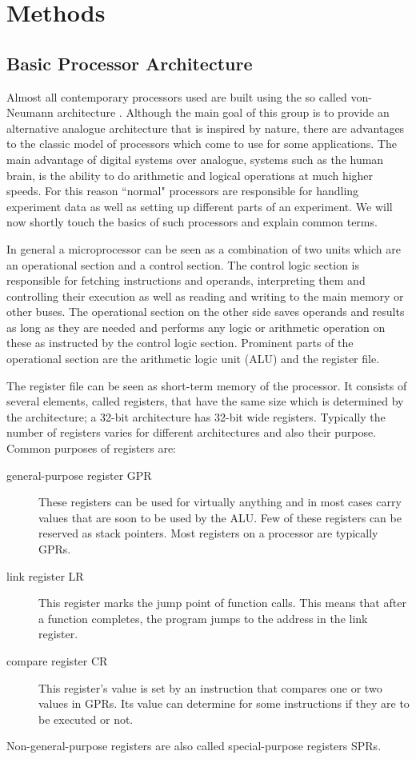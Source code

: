 \chapter{Methods}
\label{chapter:methods}

\section{Basic Processor Architecture}
\label{section:processor}

Almost all contemporary processors used are built using the so called von-Neumann architecture .
Although the main goal of this group is to provide an alternative analogue architecture that is inspired by nature, there are advantages to the classic model of processors which come to use for some applications.
The main advantage of digital systems over analogue, systems such as the human brain, is the ability to do arithmetic and logical operations at much higher speeds.
For this reason ``normal" processors are responsible for handling experiment data as well as setting up different parts of an experiment.
We will now shortly touch the basics of such processors and explain common terms.

In general a microprocessor can be seen as a combination of two units which are an operational section and a control section.
The control logic section is responsible for fetching instructions and operands, interpreting them and controlling their execution as well as reading and writing to the main memory or other buses.
The operational section on the other side saves operands and results as long as they are needed and performs any logic or arithmetic operation on these as instructed by the control logic section.
Prominent parts of the operational section are the arithmetic logic unit (ALU) and the register file.

The register file can be seen as short-term memory of the processor.
It consists of several elements, called registers, that have the same size which is determined by the architecture; a 32-bit architecture has 32-bit wide registers.
Typically the number of registers varies for different architectures and also their purpose.
Common purposes of registers are:
\begin{description}
    \item[general-purpose register GPR] These registers can be used for virtually anything and in most cases carry values that are soon to be used by the ALU. Few of these registers can be reserved as stack pointers. Most registers on a processor are typically GPRs.
    \item[link register LR] This register marks the jump point of function calls. This means that after a function completes, the program jumps to the address in the link register.
    \item[compare register CR] This register's value is set by an instruction that compares one or two values in GPRs. Its value can determine for some instructions if they are to be executed or not.
\end{description}        
Non-general-purpose registers are also called special-purpose registers SPRs.

